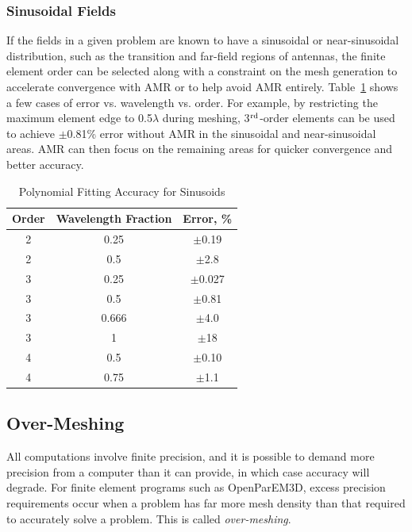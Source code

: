 \documentclass[titlepage]{article}
\renewcommand\_{\textunderscore\linebreak[1]}
\begin{document}
\subsubsection{Sinusoidal Fields}

If the fields in a given problem are known to have a sinusoidal or near-sinusoidal distribution, such as the transition and far-field regions of antennas, the finite element order can be selected along with a constraint on the mesh generation to accelerate convergence with AMR or to help avoid AMR entirely.  Table~\ref{table:sinusoidal} shows a few cases of error vs. wavelength vs. order.  For example, by restricting the maximum element edge to 0.5$\lambda$ during meshing, 3$^{\textnormal{rd}}$-order elements can be used to achieve $\pm$0.81\% error without AMR in the sinusoidal and near-sinusoidal areas.  AMR can then focus on the remaining areas for quicker convergence and better accuracy.

\begin{table}
\small
\caption{Polynomial Fitting Accuracy for Sinusoids}
\begin{center}
\begin{tabular}{|c|c|c|}
\hline
Order & Wavelength Fraction & Error, \% \\
\hline
2 & 0.25 & $\pm$0.19 \\
2 & 0.5	 & $\pm$2.8 \\
3 & 0.25 & $\pm$0.027 \\
3 & 0.5 & $\pm$0.81 \\
3 & 0.666 & $\pm$4.0 \\
3 & 1     & $\pm$18 \\
4 & 0.5   & $\pm$0.10 \\
4 & 0.75  & $\pm$1.1 \\
\hline
\end{tabular}
\end{center}
\label{table:sinusoidal}
\end{table}

\subsection{Over-Meshing}
\label{sec:overmeshing}

All computations involve finite precision, and it is possible to demand more precision from a computer than it can provide, in which case accuracy will degrade.  For finite element programs such as OpenParEM3D, excess precision requirements occur when a problem has far more mesh density than that required to accurately solve a problem.  This is called \textit{over-meshing}.  
\end{document}

